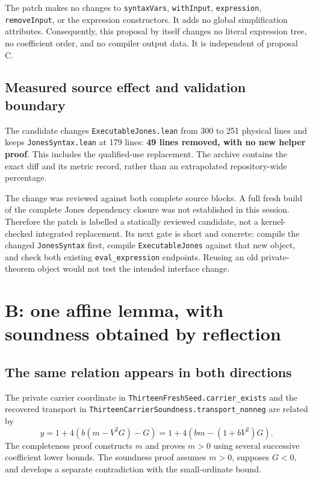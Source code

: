 \documentclass[11pt,letterpaper]{article}
\newcommand{\code}[1]{{\small\nolinkurl{#1}}}
\begin{document}
The patch makes no changes to \code{syntaxVars}, \code{withInput}, \code{expression}, \code{removeInput}, or the expression constructors. It adds no global simplification attributes. Consequently, this proposal by itself changes no literal expression tree, no coefficient order, and no compiler output data. It is independent of proposal C.

\subsection{Measured source effect and validation boundary}

The candidate changes \code{ExecutableJones.lean} from 300 to 251 physical lines and keeps \code{JonesSyntax.lean} at 179 lines: \textbf{49 lines removed, with no new helper proof}. This includes the qualified-use replacement. The archive contains the exact diff and its metric record, rather than an extrapolated repository-wide percentage.

The change was reviewed against both complete source blocks. A full fresh build of the complete Jones dependency closure was not established in this session. Therefore the patch is labelled a statically reviewed candidate, not a kernel-checked integrated replacement. Its next gate is short and concrete: compile the changed \code{JonesSyntax} first, compile \code{ExecutableJones} against that new object, and check both existing \code{eval_expression} endpoints. Reusing an old private-theorem object would not test the intended interface change.

\section{B: one affine lemma, with soundness obtained by reflection}
\label{sec:affine}

\subsection{The same relation appears in both directions}

The private carrier coordinate in \code{ThirteenFreshSeed.carrier_exists} and the recovered transport in \code{ThirteenCarrierSoundness.transport_nonneg} are related by
\begin{equation}
 y=1+4\left(b(m-V^2G)-G\right)
  =1+4\left(bm-(1+bV^2)G\right).
 \label{eq:affine}
\end{equation}
The completeness proof constructs $m$ and proves $m>0$ using several successive coefficient lower bounds. The soundness proof assumes $m>0$, supposes $G<0$, and develops a separate contradiction with the small-ordinate bound.\cite{fresh,sound}
\end{document}
